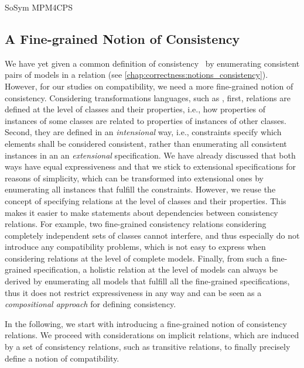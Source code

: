\begin{copiedFrom}{SoSym MPM4CPS}
\subsection{A Fine-grained Notion of Consistency}

We have yet given a common definition of consistency~\cite{stevens2010sosym} by enumerating consistent pairs of models in a relation (see \autoref{chap:correctness:notions_consistency}).
However, for our studies on compatibility, we need a more fine-grained notion of consistency.
Considering transformations languages, such as \qvtr, first, relations are defined at the level of classes and their properties, i.e., how properties of instances of some classes are related to properties of instances of other classes.
Second, they are defined in an \emph{intensional} way, i.e., constraints specify which elements shall be considered consistent, rather than enumerating all consistent instances in an an \emph{extensional} specification.
We have already discussed that both ways have equal expressiveness and that we stick to extensional specifications for reasons of simplicity, which can be transformed into extensional ones by enumerating all instances that fulfill the constraints.
However, we reuse the concept of specifying relations at the level of classes and their properties. %
This makes it easier to make statements about dependencies between consistency relations.
For example, two fine-grained consistency relations considering completely independent sets of classes cannot interfere, and thus especially do not introduce any compatibility problems, which is not easy to express when considering relations at the level of complete models.
Finally, from such a fine-grained specification, a holistic relation at the level of models can always be derived by enumerating all models that fulfill all the fine-grained specifications, thus it does not restrict expressiveness in any way and can be seen as a \emph{compositional approach} for defining consistency.

In the following, we start with introducing a fine-grained notion of consistency relations. %
We proceed with considerations on implicit relations, which are induced by a set of consistency relations, such as transitive relations, to finally precisely define a notion of compatibility.



\end{copiedFrom}

